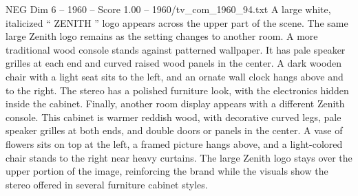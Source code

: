 \begin{textsample}{NEG Dim 6 – 1960 – Score 1.00 – 1960/tv\_com\_1960\_94.txt}
A large white, italicized “ ZENITH ” logo appears across the upper part of the scene.
The same large Zenith logo remains as the setting changes to another room.
A more traditional wood console stands against patterned wallpaper.
It has pale speaker grilles at each end and curved raised wood panels in the center.
A dark wooden chair with a light seat sits to the left, and an ornate wall clock hangs above and to the right.
The stereo has a polished furniture look, with the electronics hidden inside the cabinet.
Finally, another room display appears with a different Zenith console.
This cabinet is warmer reddish wood, with decorative curved legs, pale speaker grilles at both ends, and double doors or panels in the center.
A vase of flowers sits on top at the left, a framed picture hangs above, and a light-colored chair stands to the right near heavy curtains.
The large Zenith logo stays over the upper portion of the image, reinforcing the brand while the visuals show the stereo offered in several furniture cabinet styles.

\end{textsample}
